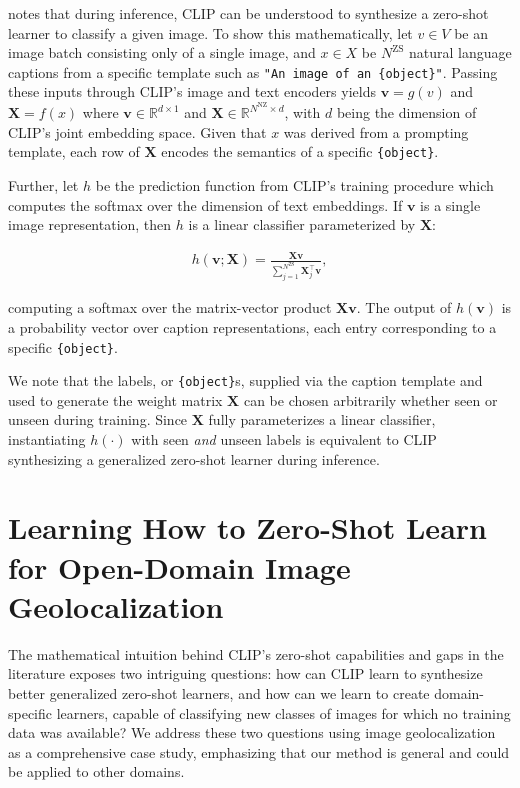 \documentclass{article}
\begin{document}
\citet{radford21a} notes that during inference, CLIP can be understood to synthesize a zero-shot learner to classify a given image. To show this mathematically, let $v \in V$ be an image batch consisting only of a single image, and $x \in X$ be $N^{\text{ZS}}$ natural language captions from a specific template such as \texttt{"An image of an \{object\}"}. Passing these inputs through CLIP's image and text encoders yields $\textbf{v} = g(v)$ and $\textbf{X} = f(x)$ where $\textbf{v} \in \mathbb{R}^{d \times 1}$ and $\textbf{X} \in \mathbb{R}^{N^{\text{NZ}} \times d}$, with $d$ being the dimension of CLIP's joint embedding space. Given that $x$ was derived from a prompting template, each row of $\textbf{X}$ encodes the semantics of a specific \texttt{\{object\}}. 

Further, let $h$ be the prediction function from CLIP's training procedure which computes the softmax over the dimension of text embeddings. If $\textbf{v}$ is a single image representation, then $h$ is a linear classifier parameterized by $\textbf{X}$: 

\begin{align}
    h(\textbf{v}; \textbf{X}) = \frac{\textbf{X}\textbf{v}}{\sum_{j=1}^{N^{\text{ZS}}} \textbf{X}_{j}^{\top} \textbf{v}},\label{eq_clip_0}
\end{align}

computing a softmax over the matrix-vector product $\textbf{X}\textbf{v}$. The output of $h(\textbf{v})$ is a probability vector over caption representations, each entry corresponding to a specific \texttt{\{object\}}.

We note that the labels, or \texttt{\{object\}}s, supplied via the caption template and used to generate the weight matrix $\textbf{X}$ can be chosen arbitrarily whether seen or unseen during training. Since $\textbf{X}$ fully parameterizes a linear classifier, instantiating $h(\cdot)$ with seen \emph{and} unseen labels is equivalent to CLIP synthesizing a generalized zero-shot learner during inference. 

\section{Learning How to Zero-Shot Learn for Open-Domain Image Geolocalization}

The mathematical intuition behind CLIP's zero-shot capabilities and gaps in the literature exposes two intriguing questions: how can CLIP learn to synthesize better generalized zero-shot learners, and how can we learn to create domain-specific learners, capable of classifying new classes of images for which no training data was available? We address these two questions using image geolocalization as a comprehensive case study, emphasizing that our method is general and could be applied to other domains.
\end{document}
